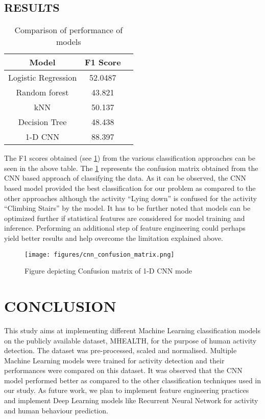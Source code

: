 \documentclass[acmtog]{acmart}
\begin{document}
\subsection{RESULTS}
\begin{table}
  \caption{Comparison of performance of models}
  \label{tab:freq}
  \begin{tabular}{ccl}
    \toprule
    Model & F1 Score\\
    \midrule
    Logistic Regression & 52.0487\\
    Random forest & 43.821\\
    kNN & 50.137\\
    Decision Tree & 48.438\\
    1-D CNN & 88.397\\
  \bottomrule
\end{tabular}
\end{table}
The F1 scores obtained (see \cref{tab:freq}) from the various classification approaches can be seen in the above table. The \cref{fig:cnn_confusion_matrix} represents the confusion matrix obtained from the CNN based approach of classifying the data. As it can be observed, the CNN based model provided the best classification for our problem as compared to the other approaches although the activity “Lying down” is confused for the activity “Climbing Stairs” by the model. It has to be further noted that models can be optimized further if statistical features are considered for model training and inference. Performing an additional step of feature engineering could perhaps yield better results and help overcome the limitation explained above. 
\begin{figure}[H]
    \centering
    \texttt{[image: figures/cnn\_confusion\_matrix.png]}
    \caption{Figure depicting Confusion matrix of 1-D CNN mode}
    \label{fig:cnn_confusion_matrix}
 \end{figure}

\section{CONCLUSION}
This study aims at implementing different Machine Learning classification models on the publicly available dataset, MHEALTH, for the purpose of human activity detection. The dataset was pre-processed, scaled and normalised. Multiple Machine Learning models were trained for activity detection and their performances were compared on this dataset. It was observed that the CNN model performed better as compared to the other classification techniques used in our study. As future work, we plan to implement feature engineering practices and implement Deep Learning models like Recurrent Neural Network for activity and human behaviour prediction.
\end{document}

